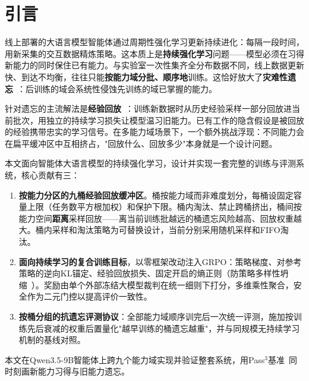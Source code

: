 \section{引言}
\label{sec:intro}

线上部署的大语言模型智能体通过周期性强化学习更新持续进化：每隔一段时间，用新采集的交互数据精炼策略。这本质上是\textbf{持续强化学习}问题——模型必须在习得新能力的同时保住已有能力。与实验室一次性集齐全分布数据不同，线上数据更新快、到达不均衡，往往只能\textbf{按能力域分批、顺序地}训练。这恰好放大了\textbf{灾难性遗忘}~\cite{D1}：后训练的域会系统性侵蚀先训练的域已掌握的能力。

针对遗忘的主流解法是\textbf{经验回放}~\cite{A2}：训练新数据时从历史经验采样一部分回放进当前批次，用独立的持续学习损失让模型温习旧能力。已有工作的隐含假设是被回放的经验携带忠实的学习信号。在多能力域场景下，一个额外挑战浮现：不同能力会在扁平缓冲区中互相挤占，"回放什么、回放多少"本身就是一个设计问题。

本文面向智能体大语言模型的持续强化学习，设计并实现一套完整的训练与评测系统，核心贡献有三：

\begin{enumerate}
  \item \textbf{按能力分区的九桶经验回放缓冲区}。桶按能力域而非难度划分，每桶设固定容量上限（任务数平方根加权）和保护下限。桶内淘汰、禁止跨桶挤出，桶间按能力空间\textbf{距离}采样回放——离当前训练批越远的桶遗忘风险越高、回放权重越大。桶内采样和淘汰策略为可替换设计，当前分别采用随机采样和FIFO淘汰。

  \item \textbf{面向持续学习的复合训练目标}，以零框架改动注入GRPO：策略梯度、对参考策略的逆向KL锚定、经验回放损失、固定开启的熵正则（防策略多样性坍缩~\cite{B4}）。奖励由单个外部冻结大模型裁判在统一细则下打分，多维乘性聚合，安全作为二元门控以提高评价一致性。

  \item \textbf{按桶分组的抗遗忘评测协议}：全部能力域顺序训完后一次统一评测，施加按训练先后衰减的权重后置量化"越早训练的桶遗忘越重"，并与同规模无持续学习机制的基线对照。
\end{enumerate}

本文在Qwen3.5-9B智能体上跨九个能力域实现并验证整套系统，用Pass$^3$基准~\cite{C1}同时刻画新能力习得与旧能力遗忘。
